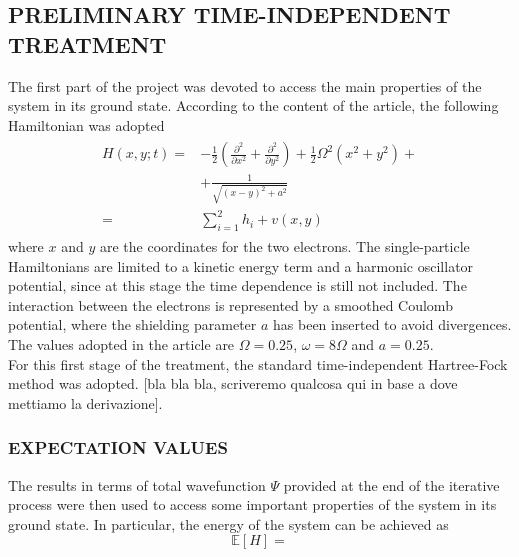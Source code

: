 \subsection{PRELIMINARY TIME-INDEPENDENT TREATMENT}
The first part of the project was devoted to access the main properties of the system in its ground state. According to the content of the article, the following Hamiltonian was adopted
\begin{align}
\begin{split}
    H(x,y; t) =& -\frac{1}{2} \left( \frac{\partial^2}{\partial x^2} + \frac{\partial^2}{\partial y^2} \right) + \frac{1}{2} \Omega^2 (x^2 + y^2) + \\
    & + \frac{1}{\sqrt{(x-y)^2 + a^2}} \\
    =& \sum_{i=1}^2 h_i + v(x,y)
\end{split}  
\label{eq:hamiltonian_t_indep}
\end{align}
where $x$ and $y$ are the coordinates for the two electrons. The single-particle Hamiltonians are limited to a kinetic energy term and a harmonic oscillator potential, since at this stage the time dependence is still not included. The interaction between the electrons is represented by a smoothed Coulomb potential, where the shielding parameter $a$ has been inserted to avoid divergences. The values adopted in the article are $\Omega=0.25$, $\omega=8\Omega$ and $a=0.25$. \\

For this first stage of the treatment, the standard time-independent Hartree-Fock method was adopted. [bla bla bla, scriveremo qualcosa qui in base a dove mettiamo la derivazione].

\subsubsection{EXPECTATION VALUES}
The results in terms of total wavefunction $\Psi$ provided at the end of the iterative process were then used to access some important properties of the system in its ground state. In particular, the energy of the system can be achieved as
\begin{equation*}
    \mathbb{E}[H] =
\end{equation*}





